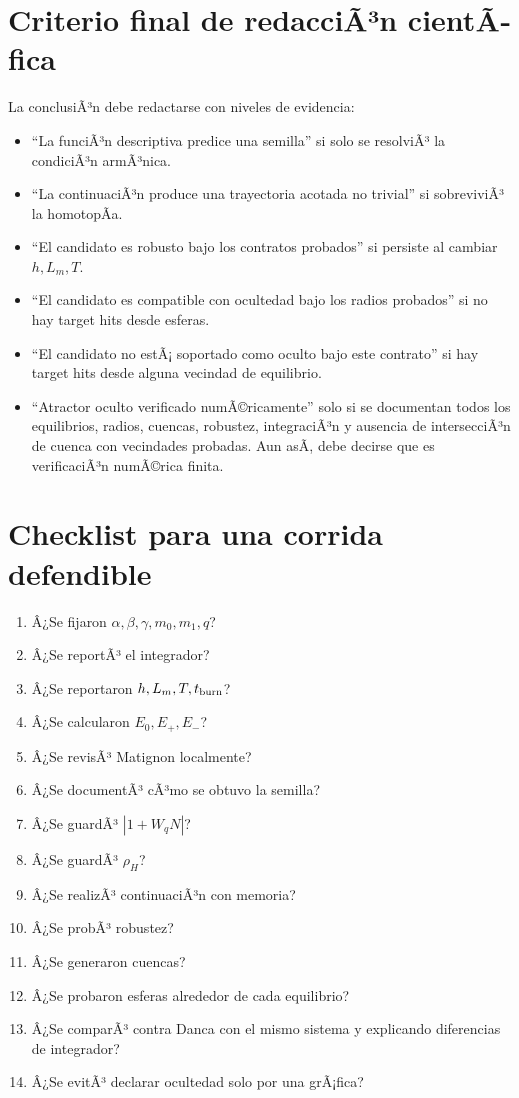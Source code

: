 \documentclass[11pt]{article}
\begin{document}
\section{Criterio final de redacciÃ³n cientÃ­fica}

La conclusiÃ³n debe redactarse con niveles de evidencia:

\begin{itemize}
\item ``La funciÃ³n descriptiva predice una semilla'' si solo se resolviÃ³ la condiciÃ³n armÃ³nica.
\item ``La continuaciÃ³n produce una trayectoria acotada no trivial'' si sobreviviÃ³ la homotopÃ­a.
\item ``El candidato es robusto bajo los contratos probados'' si persiste al cambiar \(h,L_m,T\).
\item ``El candidato es compatible con ocultedad bajo los radios probados'' si no hay target hits desde esferas.
\item ``El candidato no estÃ¡ soportado como oculto bajo este contrato'' si hay target hits desde alguna vecindad de equilibrio.
\item ``Atractor oculto verificado numÃ©ricamente'' solo si se documentan todos los equilibrios, radios, cuencas, robustez, integraciÃ³n y ausencia de intersecciÃ³n de cuenca con vecindades probadas. Aun asÃ­, debe decirse que es verificaciÃ³n numÃ©rica finita.
\end{itemize}

\section{Checklist para una corrida defendible}

\begin{enumerate}
\item Â¿Se fijaron \(\alpha,\beta,\gamma,m_0,m_1,q\)?
\item Â¿Se reportÃ³ el integrador?
\item Â¿Se reportaron \(h,L_m,T,t_{\rm burn}\)?
\item Â¿Se calcularon \(E_0,E_+,E_-\)?
\item Â¿Se revisÃ³ Matignon localmente?
\item Â¿Se documentÃ³ cÃ³mo se obtuvo la semilla?
\item Â¿Se guardÃ³ \(|1+W_qN|\)?
\item Â¿Se guardÃ³ \(\rho_H\)?
\item Â¿Se realizÃ³ continuaciÃ³n con memoria?
\item Â¿Se probÃ³ robustez?
\item Â¿Se generaron cuencas?
\item Â¿Se probaron esferas alrededor de cada equilibrio?
\item Â¿Se comparÃ³ contra Danca con el mismo sistema y explicando diferencias de integrador?
\item Â¿Se evitÃ³ declarar ocultedad solo por una grÃ¡fica?
\end{enumerate}
\end{document}
